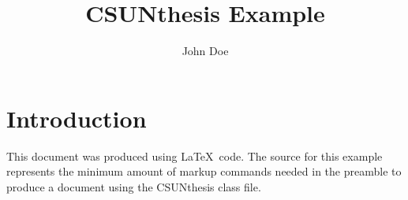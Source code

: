 \documentclass[12pt]{CSUNthesis}
\author{John Doe}
\title{CSUNthesis Example}
\begin{document}
\chapter{Introduction}
This document was produced using \LaTeX\ code. 
The source for this example represents the minimum amount of markup commands needed in the preamble to produce a document using the \textsf{CSUNthesis} class file.
\end{document}
